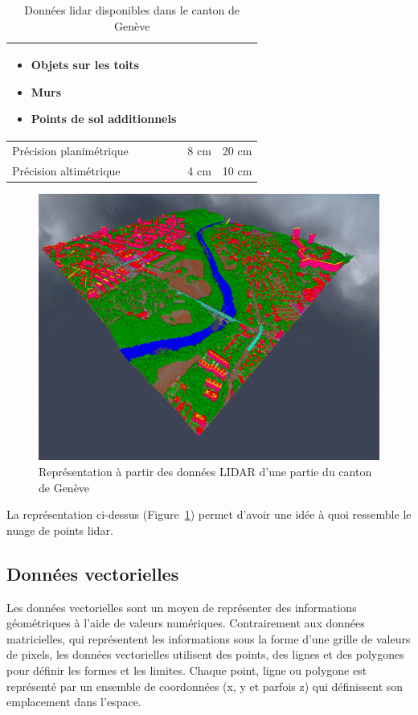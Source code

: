 \begin{table}[H]
\begin{tabular}{|p{2.5cm}|p{5.25cm}|p{5.25cm}|}
\begin{itemize}[leftmargin=*, topsep=0pt, itemsep=0pt, parsep=0pt]
        \item Objets sur les toits
        \item Murs
        \item Points de sol additionnels
    \end{itemize} \\
    \hline
    Précision planimétrique & 8 cm & 20 cm \\
    \hline
    Précision altimétrique & 4 cm & 10 cm \\
    \hline
    \end{tabular}
    \caption{Données \gls{lidar} disponibles dans le canton de Genève}
    \label{tab:lidar_geneve_compact}
\end{table}

\begin{figure}[H]
    \centering
    \includegraphics[width=0.75\linewidth]{03-tail//A1_fondamentaux_ML//A1_figures/A1_19_geneve_lidar.png}
    \caption{Représentation à partir des données LIDAR d’une partie du canton de Genève \cite{sitg_nuages_2023}}
    \label{fig:A1_19_geneve_lidar}
\end{figure}
La représentation ci-dessus (Figure~\ref{fig:A1_19_geneve_lidar}) permet d'avoir une idée à quoi ressemble le nuage de points \gls{lidar}.

\subsection{Données vectorielles}
\label{subsec:annexe_donnees_vectorielles}
Les données vectorielles sont un moyen de représenter des informations géométriques à l'aide de valeurs numériques. Contrairement aux données matricielles, qui représentent les informations sous la forme d'une grille de valeurs de pixels, les données vectorielles utilisent des points, des lignes et des polygones pour définir les formes et les limites. Chaque point, ligne ou polygone est représenté par un ensemble de coordonnées (x, y et parfois z) qui définissent son emplacement dans l'espace.

